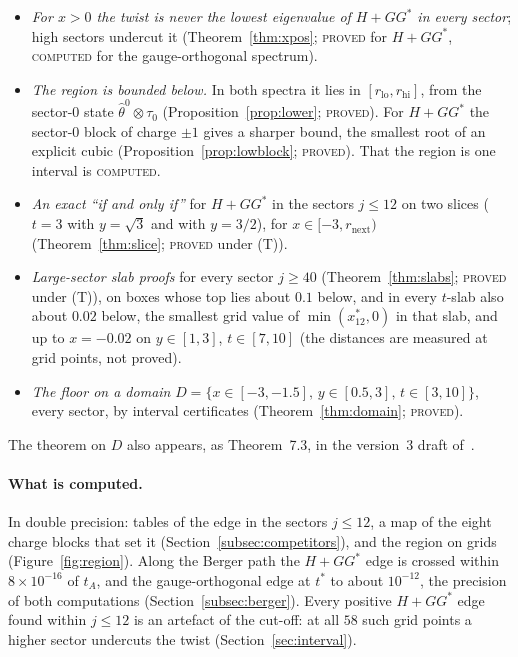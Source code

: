 \documentclass[11pt]{article}
\theoremstyle{definition}
\theoremstyle{remark}
\newcommand{\PROVED}{\textsc{proved}}
\newcommand{\COMPUTED}{\textsc{computed}}
\newcommand{\PROVEDT}{\textsc{proved} under (T)}
\begin{document}
\begin{itemize}
    factors as $-16384\,P_1P_2$ (Proposition~\ref{prop:edgepoly}; \PROVED), and on the Berger path
    $P_2=-32(s-1)(s+1)Q_{16}(s)$ with $Q_{16}$ the polynomial of $t_A$ (Proposition~\ref{prop:bergerrestriction};
    \PROVED, a polynomial identity).
    Both identities, and a bracket for the crossing, are checked in Lean~4: sixteen theorems in all
    (Section~\ref{subsec:lean}).
  \item \emph{For $x>0$ the twist is never the lowest eigenvalue of $H+GG^*$ in every sector}; high sectors undercut
    it (Theorem~\ref{thm:xpos}; \PROVED{} for $H+GG^*$, \COMPUTED{} for the gauge-orthogonal spectrum).
  \item \emph{The region is bounded below.} In both spectra it lies in $[r_{\mathrm{lo}},r_{\mathrm{hi}}]$, from the
    sector-$0$ state $\hat\theta^0\otimes\tau_0$ (Proposition~\ref{prop:lower}; \PROVED). For $H+GG^*$ the sector-$0$
    block of charge $\pm1$ gives a sharper bound, the smallest root of an explicit cubic
    (Proposition~\ref{prop:lowblock}; \PROVED). That the region is one interval is \COMPUTED.
  \item \emph{An exact ``if and only if''} for $H+GG^*$ in the sectors $j\le12$ on two slices ($t=3$ with $y=\sqrt3$
    and with $y=3/2$), for $x\in[-3,r_{\mathrm{next}})$ (Theorem~\ref{thm:slice}; \PROVEDT).
  \item \emph{Large-sector slab proofs} for every sector $j\ge40$ (Theorem~\ref{thm:slabs}; \PROVEDT), on boxes
    whose top lies about $0.1$ below, and in every $t$-slab also about $0.02$ below, the smallest grid value of
    $\min(x^*_{12},0)$ in that slab, and up to $x=-0.02$ on $y\in[1,3]$, $t\in[7,10]$ (the distances are measured at
    grid points, not proved).
  \item \emph{The floor on a domain} $D=\{x\in[-3,-1.5],\,y\in[0.5,3],\,t\in[3,10]\}$, every sector, by interval
    certificates (Theorem~\ref{thm:domain}; \PROVED).
\end{itemize}
The theorem on $D$ also appears, as Theorem~7.3, in the version~3 draft of~\cite{davisfloor2026}.

\paragraph{What is computed.} In double precision: tables of the edge in the sectors $j\le12$, a map of the eight
charge blocks that set it (Section~\ref{subsec:competitors}), and the region on grids (Figure~\ref{fig:region}). Along
the Berger path the $H+GG^*$ edge is crossed within $8\times10^{-16}$ of $t_A$, and the gauge-orthogonal edge at $t^*$
to about $10^{-12}$, the precision of both computations (Section~\ref{subsec:berger}). Every positive $H+GG^*$ edge
found within $j\le12$ is an artefact of the cut-off: at all $58$ such grid points a higher sector undercuts the twist
(Section~\ref{sec:interval}).
\end{document}
